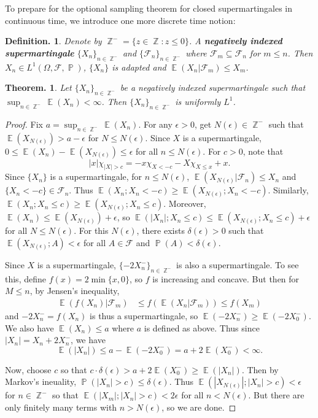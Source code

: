 \documentclass[11pt, a4paper]{memoir}
\DeclareMathOperator{\Z}{{\mathbb{Z}}}
\theoremstyle{change}
\newtheorem{theorem}{Theorem.}[section]
\theoremstyle{plain}
\theoremstyle{nonumberplain}
\newtheorem{definition}{Definition.}
\newtheorem{proof}{Proof}
\DeclareMathOperator{\pr}{{\mathbb{P}}}
\DeclareMathOperator{\E}{{\mathbb{E}}}
\newcommand{\defn}[1]{{\boldmath\bfseries #1}}
\numberwithin{equation}{section}
\begin{document}
To prepare for the optional sampling theorem for closed supermartingales in continuous time, we introduce one more discrete time notion:
\begin{definition}
    Denote by $\Z^-=\{z\in\Z:z\leq 0\}$.
    A \defn{negatively indexed supermartingale} $\{X_n\}_{n\in\Z^-}$ and $\{\mathcal{F}_n\}_{n\in\Z^-}$ where $\mathcal{F}_m\subseteq\mathcal{F}_n$ for $m\leq n$.
    Then $X_n\in L^1(\Omega,\mathcal{F},\pr)$, $\{X_n\}$ is adapted and $\E(X_n|\mathcal{F}_m)\leq X_m$.
\end{definition}
\begin{theorem}
    Let $\{X_n\}_{n\in\Z^-}$ be a negatively indexed supermartingale such that $\sup_{n\in\Z^-}\E(X_n)<\infty$.
    Then $\{X_n\}_{n\in\Z^-}$ is uniformly $L^1$.
\end{theorem}
\begin{proof}
    Fix $a=\sup_{n\in\Z^-}\E(X_n)$.
    For any $\epsilon>0$, get $N(\epsilon)\in\Z^-$ such that $\E(X_{N(\epsilon)})>a-\epsilon$ for $N\leq N(\epsilon)$.
    Since $X$ is a supermartingale, $0\leq\E(X_n)-\E(X_{N(\epsilon)})\leq\epsilon$ for all $n\leq N(\epsilon)$.
    For $c>0$, note that
    \begin{equation*}
        |x|\chi_{|X|>c}=-x\chi_{X<-c}-X\chi_{X\leq x}+x.
    \end{equation*}
    Since $\{X_n\}$ is a supermartingale, for $n\leq N(\epsilon)$, $\E(X_{N(\epsilon)}|\mathcal{F}_n)\leq X_n$ and $\{X_n<-c\}\in\mathcal{F}_n$.
    Thus $\E(X_n;X_n<-c)\geq\E(X_{N(\epsilon)};X_n<-c)$.
    Similarly, $\E(X_n;X_n\leq c)\geq\E(X_{N(\epsilon)};X_n\leq c)$.
    Moreover, $\E(X_n)\leq\E(X_{N(\epsilon)})+\epsilon$, so $\E(|X_n|;X_n\leq c)\leq\E(X_{N(\epsilon)};X_n\leq c)+\epsilon$ for all $N\leq N(\epsilon)$.
    For this $N(\epsilon)$, there exists $\delta(\epsilon)>0$ such that $\E(X_{N(\epsilon)};A)<\epsilon$ for all $A\in\mathcal{F}$ and $\pr(A)<\delta(\epsilon)$.

    Since $X$ is a supermartingale, $\{-2X_n^-\}_{n\in\Z^-}$ is also a supermartingale.
    To see this, define $f(x)=2\min\{x,0\}$, so $f$ is increasing and concave.
    But then for $M\leq n$, by Jensen's inequality,
    \begin{align*}
        \E(f(X_n)|\mathcal{F}_m) &\leq f(\E(X_n|\mathcal{F}_m))\leq f(X_m)
    \end{align*}
    and $-2X_n^-=f(X_n)$ is thus a supermartingale, so $\E(-2X_n^-)\geq\E(-2X_0^-)$.
    We also have $\E(X_n)\leq a$ where $a$ is defined as above.
    Thus since $|X_n|=X_n+2X_n^-$, we have
    \begin{equation*}
        \E(|X_n|)\leq a-\E(-2X_0^-)=a+2\E(X_0^-)<\infty.
    \end{equation*}

    Now, choose $c$ so that $c\cdot\delta(\epsilon)>a+2\E(X_0^-)\geq\E(|X_n|)$.
    Then by Markov's ineuality, $\pr(|X_n|>c)\leq\delta(\epsilon)$.
    Thus $\E(|X_{N(\epsilon)}|;|X_n|>c)<\epsilon$ for $n\in\Z^-$ so that $\E(|X_m|;|X_n|>c)<2\epsilon$ for all $n<N(\epsilon)$.
    But there are only finitely many terms with $n>N(\epsilon)$, so we are done.
\end{proof}
\end{document}
